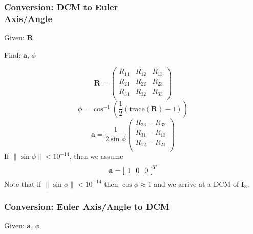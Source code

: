 \subsubsection{Conversion:  DCM to Euler\\ Axis/Angle}


Given:  $\mathbf{R}$

\noindent Find: $\mathbf{a}$, $\phi$

\begin{equation}
     \mathbf{R}  = \begin{pmatrix}
     R_{11} & R_{12} & R_{13}\\
     R_{21} & R_{22} & R_{23}\\
     R_{31} & R_{32} & R_{33}\\
     \end{pmatrix}
\end{equation}
%
\begin{equation}
   \phi = \cos^{-1}\left( \frac{1}{2}\left(\mbox{trace}(\mathbf{R}) -
   1 \right)\right)
\end{equation}
%
\begin{equation}
    \mathbf{a} = \frac{1}{2\sin{\phi}}\begin{pmatrix}
     R_{23} - R_{32}\\
     R_{31} - R_{13}\\
     R_{12} - R_{21}\\
     \end{pmatrix}
\end{equation}
%
If $\|\sin{\phi} \| < 10^{-14}$, then we assume
%
\begin{equation}
    \mathbf{a} = \left[\hspace{.05 in} 1 \hspace{.1 in} 0 \hspace{.1 in}
    0 \hspace{.05 in} \right]^T
\end{equation}
%
Note that if $\|\sin{\phi} \| < 10^{-14}$ then $\cos{\phi} \approx
1 $ and we arrive at a DCM of $\mathbf{I}_3$.


\subsubsection{Conversion:  Euler Axis/Angle to DCM}  \label{Sec:EulerAxis/AngletoDCM}

Given:  $\mathbf{a}$, $\phi$

